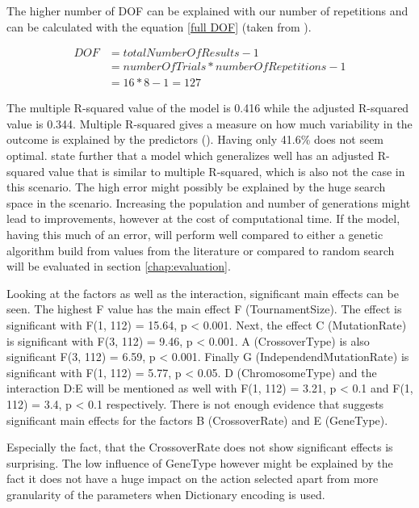 The higher number of DOF can be explained with our number of repetitions and can be calculated with the equation \ref{full DOF} (taken from \cite{roy_primer_1990}).

\begin{equation} \label{full DOF}
	\begin{split}
		DOF & = totalNumberOfResults - 1 \\
		& = numberOfTrials * numberOfRepetitions - 1 \\
		& = 16 * 8 - 1 = 127
	\end{split}
\end{equation}

The multiple R-squared value of the model is 0.416 while the adjusted R-squared value is 0.344. Multiple R-squared gives a measure on how much variability in the outcome is explained by the predictors (\cite{field_discovering_2012}). Having only 41.6\% does not seem optimal. \cite{field_discovering_2012} state further that a model which generalizes well has an adjusted R-squared value that is similar to multiple R-squared, which is also not the case in this scenario.
The high error might possibly be explained by the huge search space in the scenario. Increasing the population and number of generations might lead to improvements, however at the cost of computational time. If the model, having this much of an error, will perform well compared to either a genetic algorithm build from values from the literature or compared to random search will be evaluated in section \ref{chap:evaluation}.

Looking at the factors as well as the interaction, significant main effects can be seen. The highest F value has the main effect F (TournamentSize). The effect is significant with F(1, 112) = 15.64, p < 0.001. Next, the effect C (MutationRate) is significant with F(3, 112) = 9.46, p < 0.001. A (CrossoverType) is also significant F(3, 112) = 6.59, p < 0.001. Finally G (IndependendMutationRate) is significant with F(1, 112) = 5.77, p < 0.05.
D (ChromosomeType) and the interaction D:E will be mentioned as well with F(1, 112) = 3.21, p < 0.1 and F(1, 112) = 3.4, p < 0.1 respectively.
There is not enough evidence that suggests significant main effects for the factors B (CrossoverRate) and E (GeneType).

Especially the fact, that the CrossoverRate does not show significant effects is surprising. The low influence of GeneType however might be explained by the fact it does not have a huge impact on the action selected apart from more granularity of the parameters when Dictionary encoding is used.

